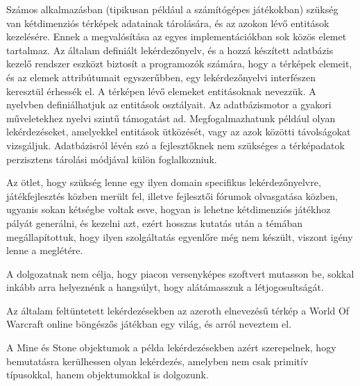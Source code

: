
Számos alkalmazásban (tipikusan például a számítógépes játékokban) szükség  van kétdimenziós térképek adatainak tárolására, és az azokon lévő entitások kezelésére. Ennek a megvalósítása az egyes implementációkban sok közös elemet tartalmaz. Az általam definiált lekérdezőnyelv, és a hozzá készített adatbázis kezelő rendszer eszközt biztosít a programozók számára, hogy a térképek elemeit, és az elemek attribútumait egyszerűbben, egy lekérdezőnyelvi interfészen keresztül érhessék el. A térképen lévő elemeket entitásoknak nevezzük. A nyelvben definiálhatjuk az entitások osztályait. Az adatbázismotor a gyakori műveletekhez nyelvi szintű támogatást ad. Megfogalmazhatunk például olyan lekérdezéseket, amelyekkel entitások ütközését, vagy az azok közötti távolságokat vizsgáljuk. Adatbázisról lévén szó a fejlesztőknek nem szükséges a térképadatok perzisztens tárolási módjával külön foglalkozniuk.

Az ötlet, hogy szükség lenne egy ilyen domain specifikus lekérdezőnyelvre, játékfejlesztés közben merült fel, illetve fejlesztői fórumok olvasgatása közben, ugyanis sokan kétségbe voltak esve, hogyan is lehetne kétdimenziós játékhoz pályát generálni, és kezelni azt, ezért hosszas kutatás után a témában megállapítottuk, hogy ilyen szolgáltatás egyenlőre még nem készült, viszont igény lenne a meglétére.

A dolgozatnak nem célja, hogy piacon versenyképes szoftvert mutasson be, sokkal inkább arra helyeznénk a hangsúlyt, hogy alátámasszuk a létjogosultságát.

Az általam feltüntetett lekérdezésekben az azeroth elnevezésű térkép a World Of Warcraft online böngészős játékban egy világ, és arról neveztem el. 

A Mine és Stone objektumok a példa lekérdezésekben azért szerepelnek, hogy bemutatásra kerülhessen olyan lekérdezés, amelyben nem csak primitív típusokkal, hanem objektumokkal is dolgozunk.
